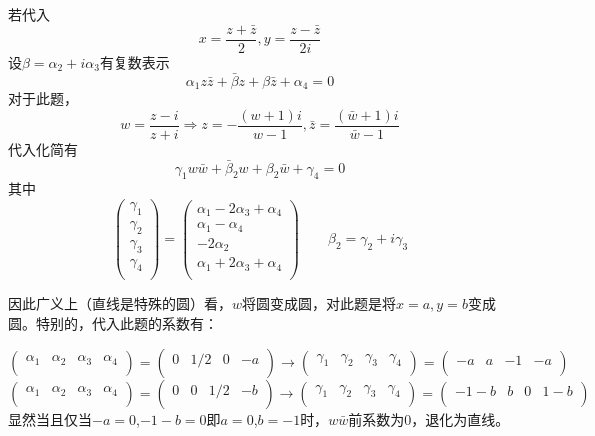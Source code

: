 \documentclass[a4paper]{ctexart}
\begin{document}
若代入
$$
    x=\frac{z+\bar{z}}{2},y=\frac{z-\bar{z}}{2i}
$$
设$\beta =\alpha _2+i\alpha _3$有复数表示
$$
    \alpha _1z\bar{z}+\bar{\beta}z+\beta \bar{z}+\alpha _4=0
$$
对于此题，
$$
    w=\frac{z-i}{z+i}\Rightarrow z=-\frac{\left( w+1 \right) i}{w-1},\bar{z}=\frac{\left( \bar{w}+1 \right) i}{\bar{w}-1}
$$
代入化简有
$$
    \gamma _1w\bar{w}+\bar{\beta}_2w+\beta _2\bar{w}+\gamma _4=0
$$
其中
$$
    \left( \begin{array}{c}
            \gamma _1 \\
            \gamma _2 \\
            \gamma _3 \\
            \gamma _4 \\
        \end{array} \right) =\left( \begin{array}{c}
            \alpha _1-2\alpha _3+\alpha _4 \\
            \alpha _1-\alpha _4            \\
            -2\alpha _2                    \\
            \alpha _1+2\alpha _3+\alpha _4 \\
        \end{array} \right) \qquad \beta _2=\gamma _2+i\gamma _3
$$

因此广义上（直线是特殊的圆）看，$w$将圆变成圆，对此题是将$x=a,y=b$变成圆。特别的，代入此题的系数有：

$$
    \left( \begin{matrix}
            \alpha _1 & \alpha _2 & \alpha _3 & \alpha _4 \\
        \end{matrix} \right) =\left( \begin{matrix}
            0 & 1/2 & 0 & -a \\
        \end{matrix} \right) \rightarrow \left( \begin{matrix}
            \gamma _1 & \gamma _2 & \gamma _3 & \gamma _4 \\
        \end{matrix} \right) =\left( \begin{matrix}
            -a & a & -1 & -a \\
        \end{matrix} \right)
$$
$$
    \left( \begin{matrix}
            \alpha _1 & \alpha _2 & \alpha _3 & \alpha _4 \\
        \end{matrix} \right) =\left( \begin{matrix}
            0 & 0 & 1/2 & -b \\
        \end{matrix} \right) \rightarrow \left( \begin{matrix}
            \gamma _1 & \gamma _2 & \gamma _3 & \gamma _4 \\
        \end{matrix} \right) =\left( \begin{matrix}
            -1-b & b & 0 & 1-b \\
        \end{matrix} \right)
$$
显然当且仅当$-a=0$,$-1-b=0$即$a=0$,$b=-1$时，$w\bar{w}$前系数为0，退化为直线。
\end{document}
